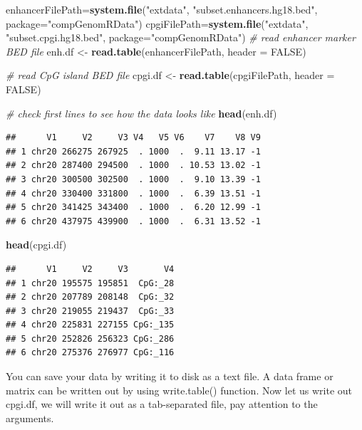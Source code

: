 \documentclass[12pt,]{krantz}
\newenvironment{Shaded}{\begin{snugshade}}{\end{snugshade}}
\newcommand{\CommentTok}[1]{\textcolor[rgb]{0.56,0.35,0.01}{\textit{#1}}}
\newcommand{\DataTypeTok}[1]{\textcolor[rgb]{0.13,0.29,0.53}{#1}}
\newcommand{\KeywordTok}[1]{\textcolor[rgb]{0.13,0.29,0.53}{\textbf{#1}}}
\newcommand{\NormalTok}[1]{#1}
\newcommand{\OtherTok}[1]{\textcolor[rgb]{0.56,0.35,0.01}{#1}}
\newcommand{\StringTok}[1]{\textcolor[rgb]{0.31,0.60,0.02}{#1}}
\theoremstyle{definition}
\theoremstyle{definition}
\theoremstyle{definition}
\theoremstyle{remark}
\begin{document}
\begin{Shaded}
\begin{Highlighting}[]
\NormalTok{enhancerFilePath=}\KeywordTok{system.file}\NormalTok{(}\StringTok{"extdata"}\NormalTok{,}
                \StringTok{"subset.enhancers.hg18.bed"}\NormalTok{,}
                \DataTypeTok{package=}\StringTok{"compGenomRData"}\NormalTok{)}
\NormalTok{cpgiFilePath=}\KeywordTok{system.file}\NormalTok{(}\StringTok{"extdata"}\NormalTok{,}
                \StringTok{"subset.cpgi.hg18.bed"}\NormalTok{,}
                \DataTypeTok{package=}\StringTok{"compGenomRData"}\NormalTok{)}
\CommentTok{# read enhancer marker BED file}
\NormalTok{enh.df <-}\StringTok{ }\KeywordTok{read.table}\NormalTok{(enhancerFilePath, }\DataTypeTok{header =} \OtherTok{FALSE}\NormalTok{) }

\CommentTok{# read CpG island BED file}
\NormalTok{cpgi.df <-}\StringTok{ }\KeywordTok{read.table}\NormalTok{(cpgiFilePath, }\DataTypeTok{header =} \OtherTok{FALSE}\NormalTok{) }

\CommentTok{# check first lines to see how the data looks like}
\KeywordTok{head}\NormalTok{(enh.df)}
\end{Highlighting}
\end{Shaded}

\begin{verbatim}
##      V1     V2     V3 V4   V5 V6    V7    V8 V9
## 1 chr20 266275 267925  . 1000  .  9.11 13.17 -1
## 2 chr20 287400 294500  . 1000  . 10.53 13.02 -1
## 3 chr20 300500 302500  . 1000  .  9.10 13.39 -1
## 4 chr20 330400 331800  . 1000  .  6.39 13.51 -1
## 5 chr20 341425 343400  . 1000  .  6.20 12.99 -1
## 6 chr20 437975 439900  . 1000  .  6.31 13.52 -1
\end{verbatim}

\begin{Shaded}
\begin{Highlighting}[]
\KeywordTok{head}\NormalTok{(cpgi.df)}
\end{Highlighting}
\end{Shaded}

\begin{verbatim}
##      V1     V2     V3       V4
## 1 chr20 195575 195851  CpG:_28
## 2 chr20 207789 208148  CpG:_32
## 3 chr20 219055 219437  CpG:_33
## 4 chr20 225831 227155 CpG:_135
## 5 chr20 252826 256323 CpG:_286
## 6 chr20 275376 276977 CpG:_116
\end{verbatim}

You can save your data by writing it to disk as a text file. A data
frame or matrix can be written out by using write.table() function. Now
let us write out cpgi.df, we will write it out as a tab-separated file,
pay attention to the arguments.
\end{document}
